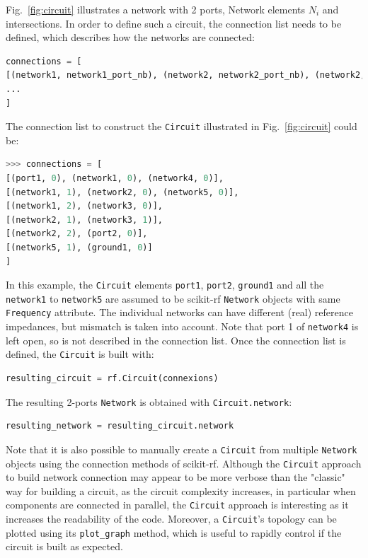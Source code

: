 \documentclass{IEEEjmw}
\begin{document}
Fig.~\ref{fig:circuit} illustrates a network with 2 ports, Network elements $N_i$ and intersections. In order to define such a circuit, the connection list needs to be defined, which describes how the networks are connected:

\begin{lstlisting}[language=Python]
connections = [
[(network1, network1_port_nb), (network2, network2_port_nb), (network2, network2_port_nb), ...], 
...
]
\end{lstlisting}

The connection list to construct the \texttt{Circuit} illustrated in Fig.~\ref{fig:circuit} could be:

\begin{lstlisting}[language=Python]
>>> connections = [
[(port1, 0), (network1, 0), (network4, 0)],
[(network1, 1), (network2, 0), (network5, 0)],
[(network1, 2), (network3, 0)],
[(network2, 1), (network3, 1)],
[(network2, 2), (port2, 0)],
[(network5, 1), (ground1, 0)]
]
\end{lstlisting}

In this example, the \texttt{Circuit} elements \texttt{port1}, \texttt{port2}, \texttt{ground1} and all the \texttt{network1} to \texttt{network5} are assumed to be scikit-rf \texttt{Network} objects with same \texttt{Frequency} attribute. The individual networks can have different (real) reference impedances, but mismatch is taken into account. Note that port 1 of \texttt{network4} is left open, so is not described in the connection list. Once the connection list is defined, the \texttt{Circuit} is built with:

\begin{lstlisting}[language=Python]
resulting_circuit = rf.Circuit(connexions)
\end{lstlisting}

The resulting 2-ports \texttt{Network} is obtained with \texttt{Circuit.network}:
\begin{lstlisting}[language=Python]
resulting_network = resulting_circuit.network
\end{lstlisting}

Note that it is also possible to manually create a \texttt{Circuit} from multiple \texttt{Network} objects using the connection methods of scikit-rf. Although the \texttt{Circuit} approach to build network connection may appear to be more verbose than the "classic" way for building a circuit, as the circuit complexity increases, in particular when components are connected in parallel, the \texttt{Circuit} approach is interesting as it increases the readability of the code. Moreover, a \texttt{Circuit}'s topology can be plotted using its \texttt{plot\_graph} method, which is useful to rapidly control if the circuit is built as expected.
\end{document}

